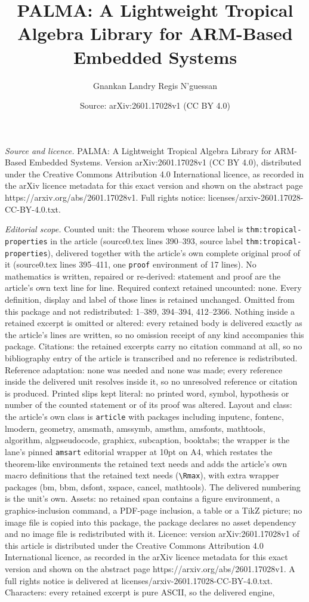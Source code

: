 \documentclass[10pt,a4paper]{amsart}
\title[PALMA: A Lightweight Tropical Algebra Library for ARM-Based ]{PALMA: A Lightweight Tropical Algebra Library for ARM-Based Embedded Systems}
\author{Gnankan Landry Regis N'guessan}
\date{Source: arXiv:2601.17028v1 (CC BY 4.0)}
\begin{document}
\maketitle

\noindent\emph{Source and licence.} PALMA: A Lightweight Tropical Algebra Library for ARM-Based Embedded Systems. Version arXiv:2601.17028v1 (CC BY 4.0), distributed under the Creative Commons Attribution 4.0 International licence, as recorded in the arXiv licence metadata for this exact version and shown on the abstract page https://arxiv.org/abs/2601.17028v1. Full rights notice: licenses/arxiv-2601.17028-CC-BY-4.0.txt.\par\smallskip

\noindent\textit{Editorial scope.} Counted unit: the Theorem whose source label is \texttt{thm:tropical-properties} in the article (source0.tex lines 390--393, source label \texttt{thm:tropical-properties}), delivered together with the article's own complete original proof of it (source0.tex lines 395--411, one \texttt{proof} environment of 17 lines). No mathematics is written, repaired or re-derived: statement and proof are the article's own text line for line. Required context retained uncounted: none. Every definition, display and label of those lines is retained unchanged. Omitted from this package and not redistributed: 1--389, 394--394, 412--2366. Nothing inside a retained excerpt is omitted or altered: every retained body is delivered exactly as the article's lines are written, so no omission receipt of any kind accompanies this package. Citations: the retained excerpts carry no citation command at all, so no bibliography entry of the article is transcribed and no reference is redistributed. Reference adaptation: none was needed and none was made; every reference inside the delivered unit resolves inside it, so no unresolved reference or citation is produced. Printed slips kept literal: no printed word, symbol, hypothesis or number of the counted statement or of its proof was altered. Layout and class: the article's own class is \texttt{article} with packages including inputenc, fontenc, lmodern, geometry, amsmath, amssymb, amsthm, amsfonts, mathtools, algorithm, algpseudocode, graphicx, subcaption, booktabs; the wrapper is the lane's pinned \texttt{amsart} editorial wrapper at 10pt on A4, which restates the theorem-like environments the retained text needs and adds the article's own macro definitions that the retained text needs (\texttt{\textbackslash Rmax}), with extra wrapper packages (bm, bbm, dsfont, xspace, cancel, mathtools). The delivered numbering is the unit's own. Assets: no retained span contains a figure environment, a graphics-inclusion command, a PDF-page inclusion, a table or a TikZ picture; no image file is copied into this package, the package declares no asset dependency and no image file is redistributed with it. Licence: version arXiv:2601.17028v1 of this article is distributed under the Creative Commons Attribution 4.0 International licence, as recorded in the arXiv licence metadata for this exact version and shown on the abstract page https://arxiv.org/abs/2601.17028v1. A full rights notice is delivered at licenses/arxiv-2601.17028-CC-BY-4.0.txt. Characters: every retained excerpt is pure ASCII, so the delivered engine, 
\end{document}
